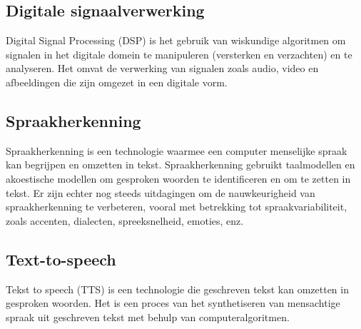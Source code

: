 \cite{basu2010use}

\subsection{Digitale signaalverwerking}

Digital Signal Processing (DSP) is het gebruik van wiskundige algoritmen om signalen in het digitale domein te manipuleren (versterken en verzachten) en te analyseren. Het omvat de verwerking van signalen zoals audio, video en afbeeldingen die zijn omgezet in een digitale vorm.

\cite{vaseghi2008advanced}

\subsection{Spraakherkenning}

Spraakherkenning is een technologie waarmee een computer menselijke spraak kan begrijpen en omzetten in tekst. Spraakherkenning gebruikt taalmodellen en akoestische modellen om gesproken woorden te identificeren en om te zetten in tekst. Er zijn echter nog steeds uitdagingen om de nauwkeurigheid van spraakherkenning te verbeteren, vooral met betrekking tot spraakvariabiliteit, zoals accenten, dialecten, spreeksnelheid, emoties, enz.

\cite{benzeghiba2007automatic}

\subsection{Text-to-speech}

Tekst to speech (TTS) is een technologie die geschreven tekst kan omzetten in gesproken woorden. Het is een proces van het synthetiseren van mensachtige spraak uit geschreven tekst met behulp van computeralgoritmen.

\cite{ren2019fastspeech}

